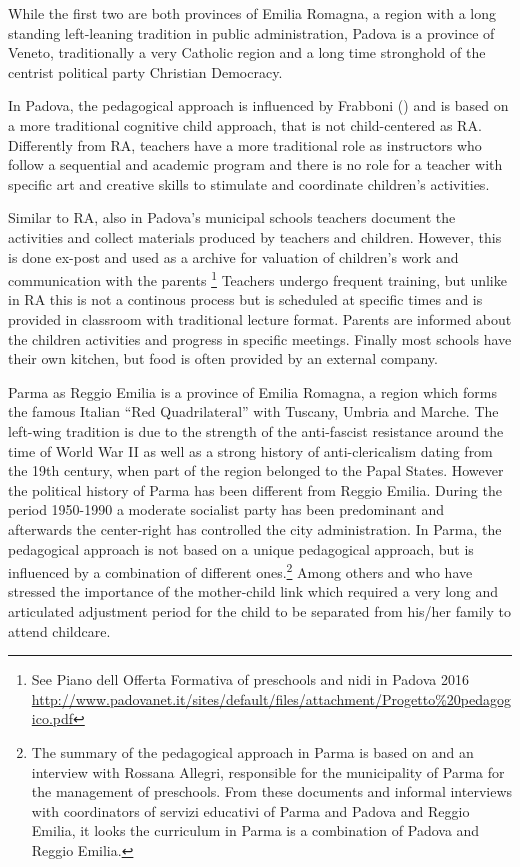\documentclass[12pt]{article}
\begin{document}
While the first two are both provinces of Emilia Romagna, a region with a long standing left-leaning tradition in public administration, Padova is a province of Veneto, traditionally a very Catholic region and a long time stronghold of the centrist political party Christian Democracy.

In Padova, the pedagogical approach is influenced by Frabboni (\cite{Frabboni1999}) and is based on a more traditional cognitive child approach, that is not child-centered as RA. Differently from RA, teachers have a more traditional role as instructors who follow a sequential and academic program and there is no role for a teacher with specific art and creative skills to stimulate and coordinate children's activities.

Similar to RA, also in Padova's municipal schools teachers document the activities and collect materials produced by teachers and children. However, this is done ex-post and used as a archive for valuation of children's work and communication with the parents \footnote{See Piano dell Offerta Formativa of preschools and nidi in Padova 2016 \url{http://www.padovanet.it/sites/default/files/attachment/Progetto\%20pedagogico.pdf}} Teachers undergo frequent training, but unlike in RA this is not a continous process but is scheduled at specific times and is provided in classroom with traditional lecture format. Parents are informed about the children activities and progress in specific meetings. Finally most schools have their own kitchen, but food is often provided by an external company.

Parma as Reggio Emilia is a province of Emilia Romagna, a region which forms the famous Italian ``Red Quadrilateral'' with Tuscany, Umbria and Marche. The left-wing tradition is due to the strength of the anti-fascist resistance around the time of World War II as well as a strong history of anti-clericalism dating from the 19th century, when part of the region belonged to the Papal States. However the political history of Parma has been different from Reggio Emilia. During the period 1950-1990 a moderate socialist party has been predominant and afterwards the center-right has controlled the city administration. In Parma, the pedagogical approach is not based on a unique pedagogical approach, but is influenced by a combination of different ones.\footnote{The summary of the pedagogical approach in Parma is based on \cite{Parma2006} and an interview with Rossana Allegri, responsible for the municipality of Parma for the management of preschools. From these documents and informal interviews with coordinators of servizi educativi of Parma and Padova and Reggio Emilia, it looks the curriculum in Parma is a combination of Padova and Reggio Emilia.} Among others \cite{Winnicott1965} and \cite{Bion1962} who have stressed the importance of the mother-child link which required a very long and articulated adjustment period for the child to be separated from his/her family to attend childcare.
\end{document}

